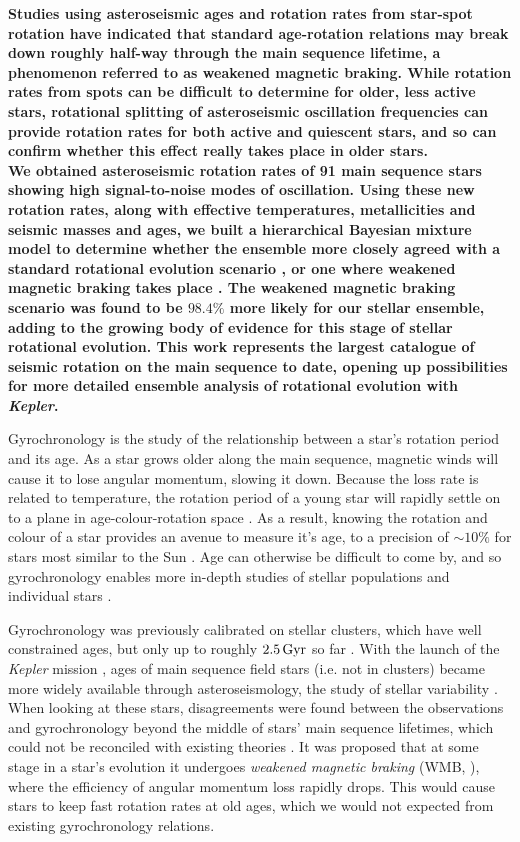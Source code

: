 \documentclass[12pt]{article}
\begin{document}
\textbf{Studies using asteroseismic ages and rotation rates from star-spot rotation have indicated that standard age-rotation relations may break down roughly half-way through the main sequence lifetime, a phenomenon referred to as weakened magnetic braking. While rotation rates from spots can be difficult to determine for older, less active stars, rotational splitting of asteroseismic oscillation frequencies can provide rotation rates for both active and quiescent stars, and so can confirm whether this effect really takes place in older stars.\\
We obtained asteroseismic rotation rates of 91 main sequence stars showing high signal-to-noise modes of oscillation.
Using these new rotation rates, along with effective temperatures, metallicities and seismic masses and ages, we built a hierarchical Bayesian mixture model to determine whether the ensemble more closely agreed with a standard rotational evolution scenario \cite{vansaders+pinsonneault2013}, or one where weakened magnetic braking takes place \cite{vansaders+2016}. The weakened magnetic braking scenario was found to be $98.4\%$ more likely for our stellar ensemble, adding to the growing body of evidence for this stage of stellar rotational evolution. This work represents the largest catalogue of seismic rotation on the main sequence to date, opening up possibilities for more detailed ensemble analysis of rotational evolution with \textit{Kepler}.}

Gyrochronology is the study of the relationship between a star's rotation period and its age. As a star grows older along the main sequence, magnetic winds will cause it to lose angular momentum, slowing it down. Because the loss rate is related to temperature, the rotation period of a young star will rapidly settle on to a plane in age-colour-rotation space \cite{barnes2007}. As a result, knowing the rotation and colour of a star provides an avenue to measure it's age, to a precision of $\sim 10\%$ for stars most similar to the Sun \cite{meibom+2015}. Age can otherwise be difficult to come by, and so gyrochronology enables more in-depth studies of stellar populations and individual stars \cite{leiner+2019,claytor+2019}.

Gyrochronology was previously calibrated on stellar clusters, which have well constrained ages, but only up to roughly $2.5\, \rm{Gyr}$ so far \cite{meibom+2015}. With the launch of the \textit{Kepler} mission \cite{borucki+2010}, ages of main sequence field stars (i.e. not in clusters) became more widely available through asteroseismology, the study of stellar variability \cite{silvaaguirre+2015}. When looking at these stars, disagreements were found between the observations and gyrochronology beyond the middle of stars' main sequence lifetimes, which could not be reconciled with existing theories \cite{angus+2015, nielsen+2015, davies+2015}. It was proposed that at some stage in a star's evolution it undergoes \textit{weakened magnetic braking} (WMB, \cite{vansaders+2016}), where the efficiency of angular momentum loss rapidly drops. This would cause stars to keep fast rotation rates at old ages, which we would not expected from existing gyrochronology relations.
\end{document}
